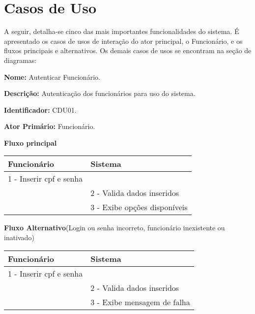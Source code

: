 \section{Casos de Uso}\label{casosdeuso}
\par 
A seguir, detalha-se cinco das mais importantes funcionalidades do sistema. É apresentado os casos de usos de interação do ator principal, o Funcionário, e os fluxos principais e alternativos. Os demais casos de usos se encontram na seção de diagramas:

\par
\textbf{Nome:} Autenticar Funcionário. 
\par
\textbf{Descrição:} Autenticação dos funcionários para uso do sistema.
\par 
\textbf{Identificador:} CDU01.
\par
\textbf{Ator Primário:} Funcionário.	
\par
\par
\textbf{Fluxo principal}\par
\begin{tabular}{|p{7cm}|p{7cm}|}
	\hline 
	Funcionário & Sistema \\ 
	\hline 
	1 - Inserir cpf e senha  &  \\ 
	\hline 
	& 
	
	2 - Valida dados inseridos 
	\\ 
	\hline 
	& 
	
	3 - Exibe opções disponíveis
	\\ 
	\hline 
\end{tabular} 
\vspace{12px}
\par
\textbf{Fluxo Alternativo}(Login ou senha incorreto, funcionário inexistente ou inativado)\par
\begin{tabular}{|p{7cm}|p{7cm}|}
	\hline 
	Funcionário & Sistema \\ 
	\hline 
	1 - Inserir cpf e senha  &  \\ 
	\hline 
	& 
	
	2 - Valida dados inseridos 
	\\ 
	\hline 
	& 
	
	3 - Exibe mensagem de falha		
	\\ 
	\hline 
\end{tabular} 
\vspace{12px}

